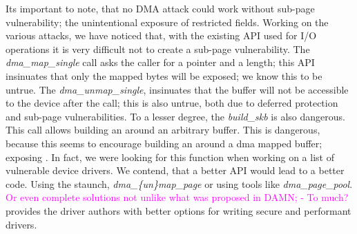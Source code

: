Its important to note, that no DMA attack could work without sub-page vulnerability; the unintentional exposure of restricted fields. Working on the various attacks, we have noticed that, with the existing API used for I/O operations it is very difficult not to create a sub-page vulnerability. The \textit{dma\_map\_single} call asks the caller for a pointer and a length; this API insinuates that only the mapped bytes will be exposed; we know this to be untrue. The \textit{dma\_unmap\_single}, insinuates that the buffer will not be accessible to the device after the call; this is also untrue, both due to deferred protection and sub-page vulnerabilities. To a lesser degree, the \textit{build\_skb} is also dangerous. This call allows building an \skb around an arbitrary buffer. This is dangerous, because this seems to encourage building an \skb around a dma mapped buffer; exposing \shinfo. In fact, we were looking for this function when working on a list of vulnerable device drivers. We contend, that a better API would lead to a better code. Using the staunch, \textit{dma\_\{un\}map\_page} or using tools like \textit{dma\_page\_pool}. \textcolor{magenta}{Or even complete solutions not unlike what was proposed in DAMN\cite{MSMT18,MMT16}; - To much?} provides the driver authors with better options for writing secure and performant drivers. 

